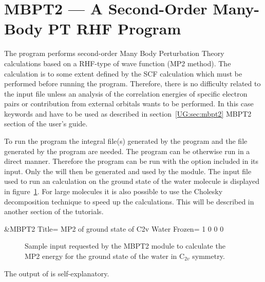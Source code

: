 \section{MBPT2 --- A Second-Order Many-Body PT RHF Program}
\label{TUT:sec:mbpt2}

The  program performs second-order Many Body Perturbation
Theory calculations based on a RHF-type of wave function (MP2 method).
The calculation is to some extent defined by the SCF
calculation which must be performed before running the 
program. Therefore, there is no difficulty related to the input file
unless an analysis of the correlation energies of specific electron
pairs or contribution from external orbitals wants to be performed.
In this case keywords  and  have to
be used as described in 
\ifmanual
section~\ref{UG:sec:mbpt2} 
\else
MBPT2 section
\fi
of the user's guide.


To run the program the  integral file(s)
generated by the  program and the  file generated
by the  program are needed. The program can be otherwise run in a
direct manner. Therefore the  program can be run
with the option  included in its input. Only the 
will then be generated and used by the  module. 
The input file used to run an  calculation on the ground state 
of the water molecule is displayed in figure~\ref{fig:mbpt2_input}. For large
molecules it is also possible to use the Cholesky decomposition technique to
speed up the calculations. This will be described in another section of the
tutorials.

\begin{inputlisting}
 &MBPT2
Title= MP2 of ground state of C2v Water 
Frozen= 1 0 0 0
\end{inputlisting}
\begin{figure}[h]
\caption{Sample input requested by the MBPT2 module to
calculate the MP2 energy for the ground state of the water in C$_{2v}$ symmetry.}
\label{fig:mbpt2_input}
\end{figure}

The output of  is self-explanatory.

%

